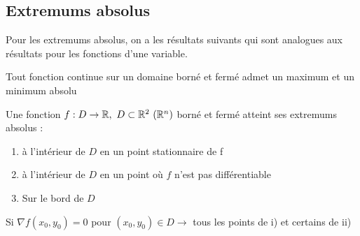 \documentclass[12pt,a4paper]{article}
\begin{document}
\subsection{Extremums absolus}
Pour les extremums absolus, on a les résultats suivants qui sont analogues aux résultats pour les fonctions d'une variable.
\begin{boite}
	 Tout fonction continue sur un domaine borné et fermé admet un maximum et un minimum absolu
\end{boite}
\begin{boite}
	 Une fonction $f: D\to \R,\ D \subset \R^2 \ (\rn)$ borné et fermé atteint ses extremums absolus :
	\begin{enumerate}
		\item 	à l'intérieur de $D$ en un point stationnaire de f
		\item 	à l'intérieur de $D$ en un point où $f$ n'est pas différentiable
		\item 	Sur le bord de $D$
	\end{enumerate}
\end{boite}
 Si $\nabla f(x_0,y_0) = 0$ pour $(x_0,y_0) \in D \to$ tous les points de i) et certains de ii)
\end{document}
